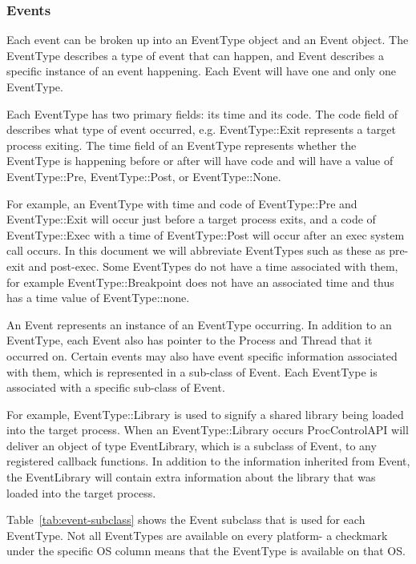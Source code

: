 \subsubsection{Events}
\label{subsubsec:events}
Each event can be broken up into
an EventType object and an Event
object. The EventType describes a type of event that can happen, and Event
describes a specific instance of an event happening. Each Event will have one
and only one EventType.

Each EventType has two primary fields: its time and its code. The code field
of describes what type of event occurred, e.g. EventType::Exit represents a
target process exiting. The time field of an EventType represents whether the
EventType is happening before or after will have code and will have a value of
EventType::Pre, EventType::Post, or EventType::None.

For example, an EventType with time and code of EventType::Pre and
EventType::Exit will occur just before a target process exits, and a code of
EventType::Exec with a time of EventType::Post will occur after an exec system
call occurs. In this document we will abbreviate EventTypes such as these as
pre-exit and post-exec. Some EventTypes do not have a time associated with
them, for example EventType::Breakpoint does not have an associated time and
thus has a time value of EventType::none.

An Event represents an instance of an EventType occurring. In addition to an
EventType, each Event also has pointer to the Process and Thread that it
occurred on. Certain events may also have event specific information
associated with them, which is represented in a sub-class of Event. Each
EventType is associated with a specific sub-class of Event.

For example, EventType::Library is used to signify a shared library being loaded
into the target process. When an EventType::Library occurs ProcControlAPI
will deliver an object of type EventLibrary, which is a subclass of Event, to
any registered callback functions. In addition to the information inherited
from Event, the EventLibrary will contain extra information about the library
that was loaded into the target process.

Table~\ref{tab:event-subclass} shows the Event subclass that is used for each EventType. Not all
EventTypes are available on every platform- a checkmark
under the specific OS column means that the EventType is available on that OS.

